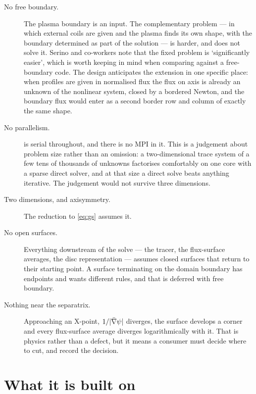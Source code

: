 \begin{description}

\item[No free boundary.] The plasma boundary is an input. The complementary
	problem --- in which external coils are given and the plasma finds its own
	shape, with the boundary determined as part of the solution --- is harder,
	and {\meq} does not solve it. Serino and co-workers \cite{Serino2024} note
	that the fixed problem is `significantly easier', which is worth keeping in
	mind when comparing against a free-boundary code. The design anticipates the
	extension in one specific place: when profiles are given in normalised flux
	the flux on axis is already an unknown of the nonlinear system, closed by a
	bordered Newton, and the boundary flux would enter as a second border row
	and column of exactly the same shape.

\item[No parallelism.] {\meq} is serial throughout, and there is no MPI in it.
	This is a judgement about problem size rather than an omission: a
	two-dimensional trace system of a few tens of thousands of unknowns
	factorises comfortably on one core with a sparse direct solver, and at that
	size a direct solve beats anything iterative. The judgement would not
	survive three dimensions.

\item[Two dimensions, and axisymmetry.] The reduction to \eqref{eq:gs} assumes
	it.

\item[No open surfaces.] Everything downstream of the solve --- the tracer, the
	flux-surface averages, the disc representation --- assumes closed surfaces
	that return to their starting point. A surface terminating on the domain
	boundary has endpoints and wants different rules, and that is deferred with
	free boundary.

\item[Nothing near the separatrix.] Approaching an X-point, $1/|\bar{\nabla}\psi|$
	diverges, the surface develops a corner and every flux-surface average
	diverges logarithmically with it. That is physics rather than a defect, but
	it means a consumer must decide where to cut, and record the decision.

\end{description}

\section{What it is built on}


